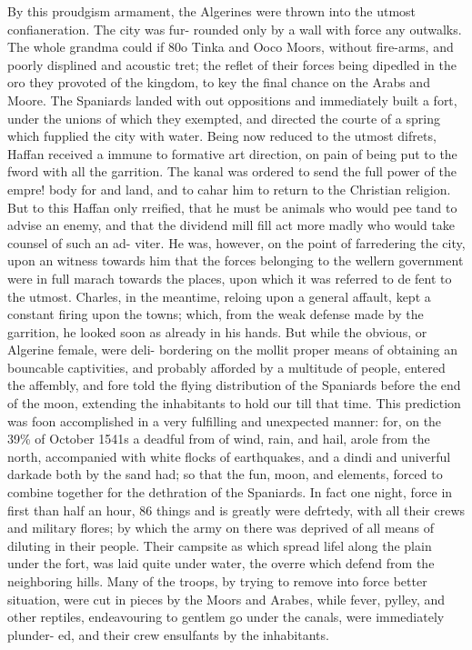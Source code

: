 By this proudgism armament, the Algerines were thrown into the utmost confianeration. The city was fur- rounded only by a wall with force any outwalks. The whole grandma could if 80o Tinka and Ooco Moors, without fire-arms, and poorly displined and acoustic tret; the reflet of their forces being dipedled in the oro they provoted of the kingdom, to key the final chance on the Arabs and Moore. The Spaniards landed with out oppositions and immediately built a fort, under the unions of which they exempted, and directed the courte of a spring which fupplied the city with water. Being now reduced to the utmost difrets, Haffan received a immune to formative art direction, on pain of being put to the fword with all the garrition. The kanal was ordered to send the full power of the empre! body for and land, and to cahar him to return to the Christian religion. But to this Haffan only rreified, that he must be animals who would pee tand to advise an enemy, and that the dividend mill fill act more madly who would take counsel of such an ad- viter. He was, however, on the point of farredering the city, upon an witness towards him that the forces belonging to the wellern government were in full marach towards the places, upon which it was referred to de fent to the utmost. Charles, in the meantime, reloing upon a general affault, kept a constant firing upon the towns; which, from the weak defense made by the garrition, he looked soon as already in his hands. But while the obvious, or Algerine female, were deli- bordering on the mollit proper means of obtaining an bouncable captivities, and probably afforded by a multitude of people, entered the affembly, and fore told the flying distribution of the Spaniards before the end of the moon, extending the inhabitants to hold our till that time. This prediction was foon accomplished in a very fulfilling and unexpected manner: for, on the 39\% of October 1541s a deadful from of wind, rain, and hail, arole from the north, accompanied with white flocks of earthquakes, and a dindi and univerful darkade both by the sand had; so that the fun, moon, and elements, forced to combine together for the dethration of the Spaniards. In fact one night, force in first than half an hour, 86 things and is greatly were defrtedy, with all their crews and military flores; by which the army on there was deprived of all means of diluting in their people. Their campsite as which spread lifel along the plain under the fort, was laid quite under water, the overre which defend from the neighboring hills. Many of the troops, by trying to remove into force better situation, were cut in pieces by the Moors and Arabes, while fever, pylley, and other reptiles, endeavouring to gentlem go under the canals, were immediately plunder- ed, and their crew ensulfants by the inhabitants.\par\medskip
